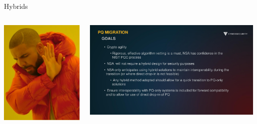 \documentclass[xcolor=table,10pt,aspectratio=169]{beamer}
\begin{document}
\begin{frame}[label={sec:orge7fefda}]{Hybrids}
\begin{columns}[t]
\begin{column}{0.3\columnwidth}
\begin{center}
\includegraphics[keepaspectratio,height=0.6\textheight]{./drake.jpg}
\end{center}
\end{column}

\begin{column}{0.7\columnwidth}
\begin{center}
\includegraphics[keepaspectratio,height=0.6\textheight]{./nsa-be-like.png}
\end{center}


\end{column}
\end{columns}
\end{frame}
\end{document}
